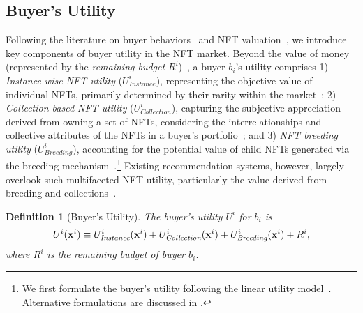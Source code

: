 \documentclass[conference]{IEEEtran}
\theoremstyle{plain}
\newtheorem{definition}{Definition}
\newcommand*{\defeq}{\equiv}
\begin{document}
\subsection{Buyer's Utility}

    \label{subsec:buyer-utility}
    Following the literature on buyer behaviors~ and NFT valuation~\cite{costa2023show}, we introduce key components of buyer utility in the NFT market. Beyond the value of money (represented by the \textit{remaining budget} $R^i$)~\cite{che2000optimal}, a buyer $b_i$'s utility comprises 1) \emph{Instance-wise NFT utility} ($U^i_\textit{Instance}$), representing the objective value of individual NFTs, primarily determined by their rarity within the market~\cite{mekacher2022heterogeneous}; 2) \emph{Collection-based NFT utility} ($U^i_\textit{Collection}$), capturing the subjective appreciation derived from owning a set of NFTs, considering the interrelationships and collective attributes of the NFTs in a buyer's portfolio~\cite{li2023motivates}; and 3) \emph{NFT breeding utility} ($U^i_\textit{Breeding}$), accounting for the potential value of child NFTs generated via the breeding mechanism~.\footnote{We first formulate the buyer's utility following the linear utility model~\cite{devanur2008market}. Alternative formulations are discussed in .} Existing recommendation systems, however, largely overlook such multifaceted NFT utility, particularly the value derived from breeding and collections~\cite{he2020lightgcn, wang2019neural}.

\begin{definition}[Buyer's Utility]    
    \label{def:buyer-utility}
    The buyer's utility $U^i$ for $b_i$ is
    \begin{equation}\small
        \label{eqn:buyer-utility}
        U^i(\mathbf{x}^i) \defeq U^i_\textit{Instance}(\mathbf{x}^i) + U^i_\textit{Collection}(\mathbf{x}^i) + U^i_\textit{Breeding}(\mathbf{x}^i) + R^i,
    \end{equation}
    where $R^i$ is the remaining budget of buyer $b_i$.
\end{definition}
\end{document}

